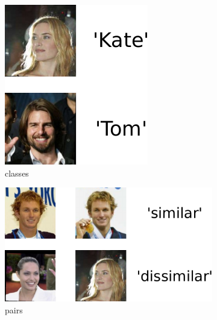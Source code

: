 \documentclass[twoside,11pt]{article}
\begin{document}
\begin{figure}[t]
    \centering
    \begin{subfigure}[t]{0.12\textwidth} %
        \centering \includegraphics[scale=0.35]{labels.pdf}
        \caption{classes}\label{fig:full}
    \end{subfigure}
    \begin{subfigure}[t]{0.20\textwidth}
        \centering \includegraphics[scale=0.35]{pairs.pdf}
        \caption{pairs}\label{fig:pairs}
    \end{subfigure}
    \begin{subfigure}[t]{0.31\textwidth}

\end{subfigure}
\end{figure}
\end{document}

